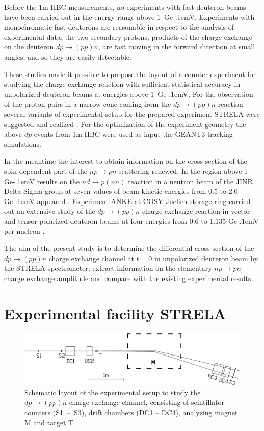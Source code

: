\documentclass[twocolumn,epjc3]{svjour3}
\newcommand{\np}     {\ensuremath{np \rightarrow pn}\xspace}
\newcommand{\dpchex} {\ensuremath{dp \rightarrow (pp)n}\xspace}
\newcommand{\GeV}    {Ge\kern-.1emV\xspace}
\begin{document}
Before the 1m HBC measurements, no experiments with fast deuteron beams have
been carried out in the energy range above 1~\GeV. Experiments with
monochromatic fast deuterons are reasonable in respect to the analysis of
experimental data: the two secondary protons, products of the charge exchange on
the deuteron \dpchex, are fast moving in the forward direction at small angles,
and so they are easily detectable.

These studies made it possible to propose the layout of a counter experiment for
studying the charge exchange reaction with sufficient statistical accuracy in
unpolarized deuteron beams at energies above 1~\GeV. For the observation of the
proton pairs in a narrow cone coming from the \dpchex reaction several variants
of experimental setup for the prepared experiment STRELA were suggested and
realized \cite{gla13}. For the optimization of the experiment geometry the above
$dp$ events from 1m HBC were used as input the GEANT3 tracking simulations.

In the meantime the interest to obtain information on the cross section of the
spin-dependent part of the \np scattering renewed. In the region above 1 \GeV
results on the $nd \rightarrow p(nn)$ reaction in a neutron beam of the JINR
Delta-Sigma group at seven values of beam kinetic energies from 0.5 to 2.0 \GeV
appeared \cite{sha09,sha09_2,shi11}. Experiment ANKE at COSY Juelich storage
ring carried out an extensive study of the \dpchex charge exchange reaction in
vector and tensor polarized deuteron beams at four energies from 0.6 to 1.135
\GeV per nucleon \cite{chi09,mch13}.

The aim of the present study is to determine the differential cross section of
the \dpchex charge exchange channel at $t = 0$ in unpolarized deuteron beam by
the STRELA spectrometer, extract information on the elementary \np charge
exchange amplitude and compare with the existing experimental results.

\section{Experimental facility STRELA}

\begin{figure}[t] %
  \centering
  \includegraphics[width=1.00\textwidth]{STRELA_layout.pdf}
  \caption{Schematic layout of the experimental setup to study the \dpchex
    charge exchange channel, consisting of scintillator counters (S1~--~S3),
    drift chambers (DC1 -- DC4), analyzing magnet M and target T}
  \label{fig:STRELA_layout}
\end{figure}
\end{document}
